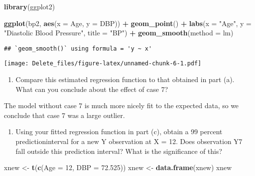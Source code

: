 \documentclass[
]{article}
\newenvironment{Shaded}{\begin{snugshade}}{\end{snugshade}}
\newcommand{\AttributeTok}[1]{\textcolor[rgb]{0.13,0.29,0.53}{#1}}
\newcommand{\DecValTok}[1]{\textcolor[rgb]{0.00,0.00,0.81}{#1}}
\newcommand{\FloatTok}[1]{\textcolor[rgb]{0.00,0.00,0.81}{#1}}
\newcommand{\FunctionTok}[1]{\textcolor[rgb]{0.13,0.29,0.53}{\textbf{#1}}}
\newcommand{\NormalTok}[1]{#1}
\newcommand{\OtherTok}[1]{\textcolor[rgb]{0.56,0.35,0.01}{#1}}
\newcommand{\SpecialCharTok}[1]{\textcolor[rgb]{0.81,0.36,0.00}{\textbf{#1}}}
\newcommand{\StringTok}[1]{\textcolor[rgb]{0.31,0.60,0.02}{#1}}
\providecommand{\tightlist}{%
  \setlength{\itemsep}{0pt}\setlength{\parskip}{0pt}}
\begin{document}
\begin{Shaded}
\begin{Highlighting}[]
\FunctionTok{library}\NormalTok{(ggplot2)}

\FunctionTok{ggplot}\NormalTok{(bp2, }\FunctionTok{aes}\NormalTok{(}\AttributeTok{x =}\NormalTok{ Age, }\AttributeTok{y =}\NormalTok{ DBP)) }\SpecialCharTok{+}
  \FunctionTok{geom\_point}\NormalTok{() }\SpecialCharTok{+}
  \FunctionTok{labs}\NormalTok{(}\AttributeTok{x =} \StringTok{"Age"}\NormalTok{, }\AttributeTok{y =} \StringTok{"Diastolic Blood Pressure"}\NormalTok{, }\AttributeTok{title =} \StringTok{"BP"}\NormalTok{) }\SpecialCharTok{+}
  \FunctionTok{geom\_smooth}\NormalTok{(}\AttributeTok{method =}\NormalTok{ lm)}
\end{Highlighting}
\end{Shaded}

\begin{verbatim}
## `geom_smooth()` using formula = 'y ~ x'
\end{verbatim}

\texttt{[image: Delete\_files/figure-latex/unnamed-chunk-6-1.pdf]}

\begin{enumerate}
\def\labelenumi{(\alph{enumi})}
\setcounter{enumi}{3}
\tightlist
\item
  Compare this estimated regression function to that obtained in part
  (a). What can you conclude about the effect of case 7?
\end{enumerate}

The model without case 7 is much more nicely fit to the expected data,
so we conclude that case 7 was a large outlier.

\begin{enumerate}
\def\labelenumi{(\alph{enumi})}
\setcounter{enumi}{4}
\tightlist
\item
  Using your fitted regression function in part (c), obtain a 99 percent
  predictioninterval for a new Y observation at X = 12. Does observation
  Y7 fall outside this prediction interval? What is the significance of
  this?
\end{enumerate}

\begin{Shaded}
\begin{Highlighting}[]
\NormalTok{xnew }\OtherTok{\textless{}{-}} \FunctionTok{t}\NormalTok{(}\FunctionTok{c}\NormalTok{(}\AttributeTok{Age =} \DecValTok{12}\NormalTok{, }\AttributeTok{DBP =} \FloatTok{72.525}\NormalTok{))}
\NormalTok{xnew }\OtherTok{\textless{}{-}} \FunctionTok{data.frame}\NormalTok{(xnew)}
\NormalTok{xnew}
\end{Highlighting}
\end{Shaded}
\end{document}
